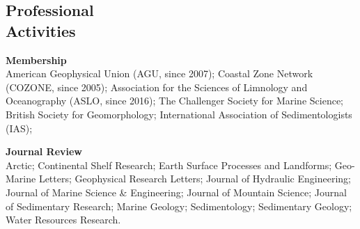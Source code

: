 \documentclass[margin,line]{resume}
\begin{document}
\begin{resume}
    \section{\mysidestyle Professional \\Activities}
    \begin{footnotesize} 
    {\bf Membership}\\
    American Geophysical Union (AGU, since 2007); Coastal Zone Network (COZONE, since 2005); Association for the Sciences of Limnology and Oceanography (ASLO, since 2016); The Challenger Society for Marine Science; British Society for Geomorphology; International Association of Sedimentologists (IAS); 

    {\bf Journal Review} \\
 	Arctic; Continental Shelf Research; Earth Surface Processes and Landforms; Geo-Marine Letters; Geophysical Research Letters; Journal of Hydraulic Engineering; Journal of Marine Science \& Engineering; Journal of Mountain Science; Journal of Sedimentary Research; Marine Geology; Sedimentology; Sedimentary Geology; Water Resources Research.
     \end{footnotesize}



\end{resume}
\end{document}
